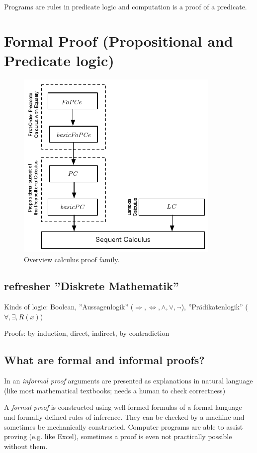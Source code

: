 Programs are rules in predicate logic and computation is a proof of a predicate.



\section{Formal Proof (Propositional and Predicate logic)}

\begin{figure}
	\centering
	\includegraphics[width=0.7\linewidth]{images/sequent_calculus_overview}
	\caption{Overview calculus proof family.}
	\label{fig:sequentcalculusoverview}
\end{figure}

\subsection{refresher ''Diskrete Mathematik''}
Kinds of logic: Boolean, ''Aussagenlogik'' ($\Rightarrow, \Leftrightarrow, \wedge, \vee, \neg$), ''Prädikatenlogik'' ($\forall,\exists, R(x)$)

Proofs: by induction, direct, indirect, by contradiction

\subsection{What are formal and informal proofs?}
In an \emph{informal proof} arguments are presented as explanations in natural language (like most mathematical textbooks; needs a human to check correctness)

A \emph{formal proof} is constructed using well-formed formulas of a formal language and formally defined rules of inference.
 They can be checked by a machine and sometimes be mechanically constructed. Computer programs are able to assist proving (e.g. like Excel), sometimes a proof is even not practically possible without them.

